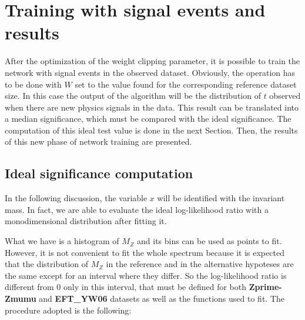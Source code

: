 \chapter{Training with signal events and results}
\label{chap:RESULTS}

After the optimization of the weight clipping parameter, it is possible to train the network with signal events in the observed dataset. Obviously, the operation has to be done with $W$ set to the value found for the corresponding reference dataset size. In this case the output of the algorithm will be the distribution of $t$ observed when there are new physics signals in the data. This result can be translated into a median significance, which must be compared with the ideal significance. The computation of this ideal test value is done in the next Section. Then, the results of this new phase of network training are presented.





\section{Ideal significance computation}
In the following discussion, the variable $x$ will be identified with the invariant mass. In fact, we are able to evaluate the ideal log-likelihood ratio with a monodimensional distribution after fitting it.

What we have is a histogram of $M_Z$ and its bins can be used as points to fit. However, it is not convenient to fit the whole spectrum because it is expected that the distribution of $M_{Z}$ in the reference and in the alternative hypoteses are the same except for an interval where they differ. So the log-likelihood ratio is different from 0 only in this interval, that must be defined for both \textbf{Zprime-Zmumu} and \textbf{EFT\_YW06} datasets as well as the functions used to fit. The procedure adopted is the following:

